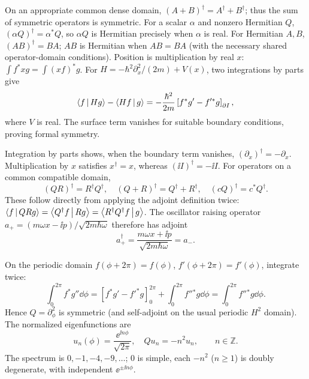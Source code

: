 On an appropriate common dense domain,
$(A+B)^\dagger=A^\dagger+B^\dagger$;
thus the sum of symmetric operators is symmetric.
For a scalar $\alpha$ and nonzero Hermitian $Q$,
$(\alpha Q)^\dagger=\alpha^*Q$, so
$\alpha Q$ is Hermitian precisely when $\alpha$ is real.
For Hermitian $A,B$, $(AB)^\dagger=BA$;
$AB$ is Hermitian when $AB=BA$ (with the
necessary shared operator-domain conditions).
Position is multiplication by real $x$:
$\int f^*xg=\int(xf)^*g$.
For $H=-\hbar^2\partial_x^2/(2m)+V(x)$,
two integrations by parts give
\begin{equation}
\left\langle f\,\middle|\,Hg\right\rangle-\left\langle Hf\,\middle|\,g\right\rangle
=-\frac{\hbar^2}{2m}
\left[f^*g'-f'^*g\right]_{\partial I},
\end{equation}
where $V$ is real. The surface term vanishes
for suitable boundary conditions, proving formal symmetry.

Integration by parts shows, when the boundary
term vanishes, $(\partial_x)^\dagger=-\partial_x$.
Multiplication by $x$ satisfies $x^\dagger=x$,
whereas $(\ii I)^\dagger=-\ii I$. For operators
on a common compatible domain,
\begin{equation}
\boxed{(QR)^\dagger=R^\dagger Q^\dagger,\quad
(Q+R)^\dagger=Q^\dagger+R^\dagger,\quad
(cQ)^\dagger=c^*Q^\dagger}.
\end{equation}
These follow directly from applying the adjoint
definition twice: $\left\langle f\,\middle|\,QRg\right\rangle
=\left\langle Q^\dagger f\,\middle|\,Rg\right\rangle
=\left\langle R^\dagger Q^\dagger f\,\middle|\,g\right\rangle$.
The oscillator raising operator
$a_+=(m\omega x-\ii p)/\sqrt{2m\hbar\omega}$
therefore has adjoint
\begin{equation}
\boxed{a_+^\dagger=
\frac{m\omega x+\ii p}{\sqrt{2m\hbar\omega}}=a_-}.
\end{equation}

On the periodic domain $f(\phi+2\pi)=f(\phi)$,
$f'(\phi+2\pi)=f'(\phi)$, integrate twice:
\begin{equation}
\int_0^{2\pi}f^*g''\dd\phi=
[f^*g'-f'^*g]_0^{2\pi}
+\int_0^{2\pi}f''{}^*g\dd\phi
=\int_0^{2\pi}f''{}^*g\dd\phi.
\end{equation}
Hence $Q=\partial_\phi^2$ is symmetric
(and self-adjoint on the usual periodic $H^2$ domain).
The normalized eigenfunctions are
\begin{equation}
\boxed{u_n(\phi)=\frac{\ee^{\ii n\phi}}{\sqrt{2\pi}}},
\quad\boxed{Q u_n=-n^2u_n},\qquad n\in\mathbb Z.
\end{equation}
The spectrum is $0,-1,-4,-9,\ldots$; $0$ is simple,
each $-n^2$ ($n\ge1$) is doubly degenerate,
with independent $\ee^{\pm\ii n\phi}$.

